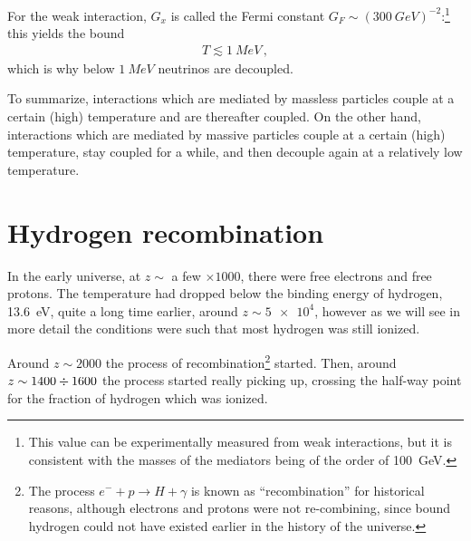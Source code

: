\documentclass[main.tex]{subfiles}
\begin{document}

For the weak interaction, \(G_x\) is called the Fermi constant \(G_F \sim (\SI{300}{GeV})^{-2}\):\footnote{This value can be  experimentally measured from weak interactions, but it is consistent with the masses of the mediators being of the order of \SI{100}{GeV}.} this yields the bound
%
\begin{align}
T \lesssim \SI{1}{MeV}
\,,
\end{align}
%
which is why below \(\SI{1}{MeV}\) neutrinos are decoupled.


To summarize, interactions which are mediated by massless particles couple at a certain (high) temperature and are thereafter coupled.
On the other hand, interactions which are mediated by massive particles couple at a certain (high) temperature, stay coupled for a while, and then decouple again at a relatively low temperature. 

\section{Hydrogen recombination}

In the early universe, at \(z \sim\) a few \(\times 1000\), there were free electrons and free protons.
The temperature had dropped below the binding energy of hydrogen, \SI{13.6}{eV}, quite a long time earlier, around \(z \sim \num{5e4}\), however as we will see in more detail the conditions were such that most hydrogen was still ionized. 

Around \(z \sim 2000\) the process of recombination\footnote{The process \(e^{-} + p \to H + \gamma \) is known as ``recombination'' for historical reasons, although electrons and protons were not re-combining, since bound hydrogen could not have existed earlier in the history of the universe.} started.
Then, around \(z \sim 1400 \divisionsymbol 1600\) \cite[table 9.1]{colespCosmology2002} the process started really picking up, crossing the half-way point for the fraction of hydrogen which was ionized. 
\end{document}
